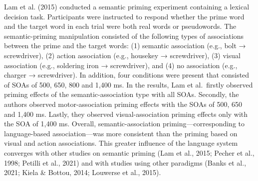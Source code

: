 \documentclass[
  12pt,
  man,floatsintext]{apa7}
\begin{document}
Lam et al. (2015) conducted a semantic priming experiment containing a lexical decision task. Participants were instructed to respond whether the prime word and the target word in each trial were both real words or pseudowords. The semantic-priming manipulation consisted of the following types of associations between the prime and the target words: (1) semantic association (e.g., bolt → screwdriver), (2) action association (e.g., housekey → screwdriver), (3) visual association (e.g., soldering iron → screwdriver), and (4) no association (e.g., charger → screwdriver). In addition, four conditions were present that consisted of SOAs of 500, 650, 800 and 1,400 ms. In the results, Lam et al.~firstly observed priming effects of the semantic-association type with all SOAs. Secondly, the authors observed motor-association priming effects with the SOAs of 500, 650 and 1,400 ms. Lastly, they observed visual-association priming effects only with the SOA of 1,400 ms. Overall, semantic-association priming---corresponding to language-based association---was more consistent than the priming based on visual and action associations. This greater influence of the language system converges with other studies on semantic priming (Lam et al., 2015; Pecher et al., 1998; Petilli et al., 2021) and with studies using other paradigms (Banks et al., 2021; Kiela \& Bottou, 2014; Louwerse et al., 2015).
\end{document}
